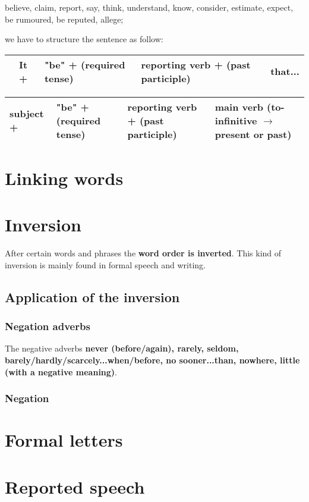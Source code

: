 \documentclass{article}
\begin{document}
believe, claim, report, say, think, understand, know, consider,
estimate, expect, be rumoured, be reputed, allege;

we have to structure the sentence as follow:\\

\begin{flushleft}
    \begin{tabular}{|m{0cm}>{\centering\arraybackslash}m{1cm}|>{\centering\arraybackslash}m{4.5cm}|>{\centering\arraybackslash}m{6cm}|>{\centering\arraybackslash}m{2cm}|}
        \hline \rule{0pt}{15pt}
        & It + & \textbf{"be"} + (required tense) & \textbf{reporting verb} + (past participle) & that... \\ 
        \hline
    \end{tabular}
\end{flushleft} \phantom{}

\begin{flushleft}
    \begin{tabular}{|>{\centering\arraybackslash}m{1.5cm}|>{\centering\arraybackslash}m{4cm}|>{\centering\arraybackslash}m{5.5cm}|>{\centering\arraybackslash}m{4cm}|}
        \hline
        subject + & \textbf{"be"} + (required tense) & \textbf{reporting verb} + (past participle) & main verb (to-infinitive $\rightarrow$ present or past) \\ 
        \hline
    \end{tabular}
\end{flushleft}

\section{Linking words}

\section{Inversion}
After certain words and phrases the \textbf{word order is inverted}.
This kind of inversion is mainly found in formal speech and writing.

\subsection{Application of the inversion}
\subsubsection{Negation adverbs}
The negative adverbs \textbf{never (before/again), rarely, seldom,
barely/hardly/scarcely...when/before, no sooner...than, nowhere,
little (with a negative meaning)}.

\subsubsection{Negation}


\section{Formal letters}

\section{Reported speech}
\end{document}
